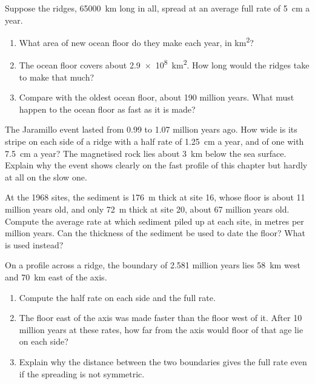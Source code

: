 \begin{exercise}[$\star\star\star$]\label{exo:g11:drift-to-spreading:12}
Suppose the ridges, \qty{65000}{km} long in all, spread at an average full rate
of \qty{5}{cm} a year.
\begin{enumerate}
  \item What area of new ocean floor do they make each year, in \unit{km^2}?
  \item The ocean floor covers about \qty{2.9e8}{km^2}. How long would the
        ridges take to make that much?
  \item Compare with the oldest ocean floor, about \num{190} million years.
        What must happen to the ocean floor as fast as it is made?
\end{enumerate}
\end{exercise}

\begin{exercise}[$\star\star\star$]\label{exo:g11:drift-to-spreading:13}
The Jaramillo event lasted from \num{0.99} to \num{1.07} million years ago.
How wide is its stripe on each side of a ridge with a half rate of
\qty{1.25}{cm} a year, and of one with \qty{7.5}{cm} a year? The magnetised
rock lies about \qty{3}{km} below the sea surface. Explain why the event shows
clearly on the fast profile of this chapter but hardly at all on the slow one.
\end{exercise}

\begin{exercise}[$\star\star\star$]\label{exo:g11:drift-to-spreading:14}
At the 1968 sites, the sediment is \qty{176}{m} thick at site 16, whose floor
is about \num{11} million years old, and only \qty{72}{m} thick at site 20,
about \num{67} million years old. Compute the average rate at which sediment
piled up at each site, in metres per million years. Can the thickness of the
sediment be used to date the floor? What is used instead?
\end{exercise}

\begin{exercise}[$\star\star\star$]\label{exo:g11:drift-to-spreading:15}
On a profile across a ridge, the boundary of \num{2.581} million years lies
\qty{58}{km} west and \qty{70}{km} east of the axis.
\begin{enumerate}
  \item Compute the half rate on each side and the full rate.
  \item The floor east of the axis was made faster than the floor west of it.
        After 10 million years at these rates, how far from the axis would
        floor of that age lie on each side?
  \item Explain why the distance between the two boundaries gives the full
        rate even if the spreading is not symmetric.
\end{enumerate}
\end{exercise}

